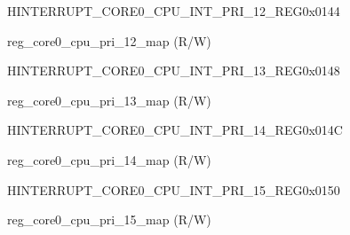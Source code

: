 \begin{register}{H}{INTERRUPT\_CORE0\_CPU\_INT\_PRI\_12\_REG}{0x0144}\label{regdesc:INTERRUPTCORE0CPUINTPRI12REG}
%
%
\regnewline%
\begin{regdesc}\begin{reglist}
\label{fielddesc:INTERRUPTCORE0CPUPRI12MAP}\item [INTERRUPT\_CORE0\_CPU\_PRI\_12\_MAP] reg\_core0\_cpu\_pri\_12\_map (R/W)
\end{reglist}\end{regdesc}
\end{register}


\begin{register}{H}{INTERRUPT\_CORE0\_CPU\_INT\_PRI\_13\_REG}{0x0148}\label{regdesc:INTERRUPTCORE0CPUINTPRI13REG}
%
%
\regnewline%
\begin{regdesc}\begin{reglist}
\label{fielddesc:INTERRUPTCORE0CPUPRI13MAP}\item [INTERRUPT\_CORE0\_CPU\_PRI\_13\_MAP] reg\_core0\_cpu\_pri\_13\_map (R/W)
\end{reglist}\end{regdesc}
\end{register}


\begin{register}{H}{INTERRUPT\_CORE0\_CPU\_INT\_PRI\_14\_REG}{0x014C}\label{regdesc:INTERRUPTCORE0CPUINTPRI14REG}
%
%
\regnewline%
\begin{regdesc}\begin{reglist}
\label{fielddesc:INTERRUPTCORE0CPUPRI14MAP}\item [INTERRUPT\_CORE0\_CPU\_PRI\_14\_MAP] reg\_core0\_cpu\_pri\_14\_map (R/W)
\end{reglist}\end{regdesc}
\end{register}


\begin{register}{H}{INTERRUPT\_CORE0\_CPU\_INT\_PRI\_15\_REG}{0x0150}\label{regdesc:INTERRUPTCORE0CPUINTPRI15REG}
%
%
\regnewline%
\begin{regdesc}\begin{reglist}
\label{fielddesc:INTERRUPTCORE0CPUPRI15MAP}\item [INTERRUPT\_CORE0\_CPU\_PRI\_15\_MAP] reg\_core0\_cpu\_pri\_15\_map (R/W)
\end{reglist}\end{regdesc}
\end{register}



